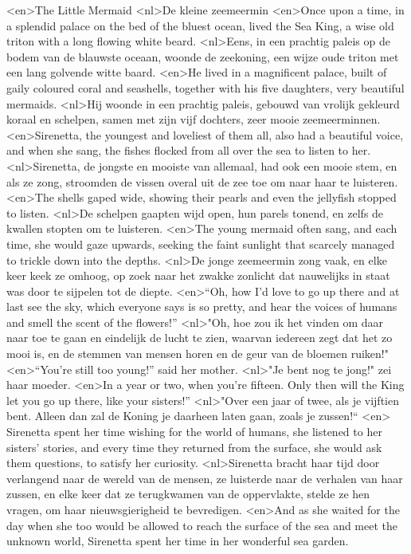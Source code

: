 <en>The Little Mermaid
<nl>De kleine zeemeermin
<en>Once upon a time, in a splendid palace on the bed of the bluest ocean, lived the Sea King, a wise old triton with a long flowing white beard.
<nl>Eens, in een prachtig paleis op de bodem van de blauwste oceaan, woonde de zeekoning, een wijze oude triton met een lang golvende witte baard.
<en>He lived in a magnificent palace, built of gaily coloured coral and seashells, together with his five daughters, very beautiful mermaids.
<nl>Hij woonde in een prachtig paleis, gebouwd van vrolijk gekleurd koraal en schelpen, samen met zijn vijf dochters, zeer mooie zeemeerminnen.
<en>Sirenetta, the youngest and loveliest of them all, also had a beautiful voice, and when she sang, the fishes flocked from all over the sea to listen to her.
<nl>Sirenetta, de jongste en mooiste van allemaal, had ook een mooie stem, en als ze zong, stroomden de vissen overal uit de zee toe om naar haar te luisteren.
<en>The shells gaped wide, showing their pearls and even the jellyfish stopped to listen.
<nl>De schelpen gaapten  wijd open,  hun parels  tonend, en zelfs de kwallen stopten om te luisteren.
<en>The young mermaid often sang, and each time, she would gaze upwards, seeking the faint sunlight that scarcely managed to trickle down into the depths.
<nl>De jonge zeemeermin zong vaak, en elke keer keek ze omhoog, op zoek naar het zwakke zonlicht dat nauwelijks in staat was door te sijpelen tot de diepte.
<en>“Oh, how I’d love to go up there and at last see the sky, which everyone says is so pretty, and hear the voices of humans and smell the scent of the flowers!”
<nl>"Oh, hoe zou ik het vinden om daar naar toe te gaan en eindelijk de lucht te zien, waarvan iedereen zegt dat het zo mooi is, en de stemmen van mensen horen en de geur van de bloemen ruiken!"
<en>“You’re still too young!” said her mother.
<nl>"Je bent nog te jong!" zei haar moeder.
<en>In a year or two, when you’re fifteen. Only then will the King let you go up there, like your sisters!”
<nl>"Over een jaar of twee, als je vijftien bent. Alleen dan zal de Koning je daarheen laten gaan, zoals je zussen!“
<en> Sirenetta spent her time wishing for the world of humans, she listened to her sisters’ stories, and every time they returned from the surface, she would ask them questions, to satisfy her curiosity.
<nl>Sirenetta bracht haar tijd door verlangend naar de wereld van de mensen, ze luisterde naar de verhalen van haar zussen, en elke keer dat ze terugkwamen van de oppervlakte, stelde ze hen vragen, om haar nieuwsgierigheid te bevredigen.
<en>And as she waited for the day when she too would be allowed to reach the surface of the sea and meet the unknown world, Sirenetta spent her time in her wonderful sea garden.
